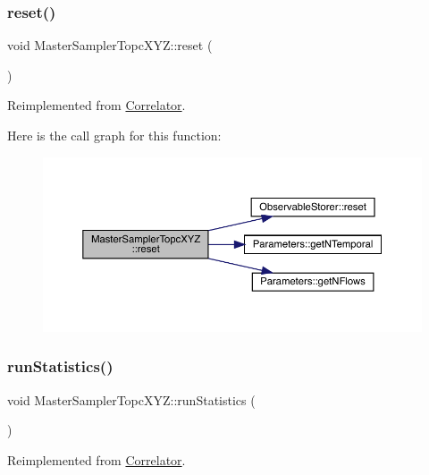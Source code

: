 \subsubsection{\texorpdfstring{reset()}{reset()}}
{\footnotesize\ttfamily void Master\+Sampler\+Topc\+X\+Y\+Z\+::reset (\begin{DoxyParamCaption}{ }\end{DoxyParamCaption})\hspace{0.3cm}{\ttfamily [virtual]}}



Reimplemented from \mbox{\hyperlink{class_correlator_aacca40262d2cd62f0a3964e832f948c1}{Correlator}}.

Here is the call graph for this function\+:\nopagebreak
\begin{figure}[H]
\begin{center}
\leavevmode
\includegraphics[width=350pt]{class_master_sampler_topc_x_y_z_aef8d0b1b431711c6410cfece1c007b4a_cgraph}
\end{center}
\end{figure}
\mbox{\label{class_master_sampler_topc_x_y_z_af748653ded9908f78383185475b9ddeb}} 
\subsubsection{\texorpdfstring{runStatistics()}{runStatistics()}}
{\footnotesize\ttfamily void Master\+Sampler\+Topc\+X\+Y\+Z\+::run\+Statistics (\begin{DoxyParamCaption}{ }\end{DoxyParamCaption})\hspace{0.3cm}{\ttfamily [virtual]}}



Reimplemented from \mbox{\hyperlink{class_correlator_a35197b1d12b62ef30b79c0138a26456e}{Correlator}}.


